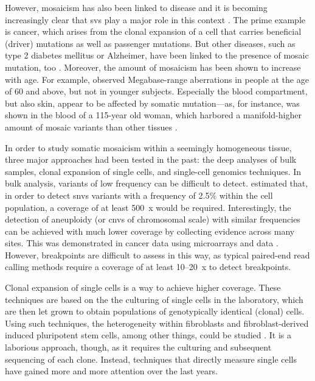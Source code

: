 However, mosaicism has also been linked to
disease and it is becoming increasingly clear that \aclp{sv} play a major
role in this context \citep{Forsberg2017}. The prime example is cancer, which
arises from the clonal expansion of a cell that carries beneficial (driver)
mutations as well as passenger mutations. But other
diseases, such as type 2 diabetes mellitus or Alzheimer, have been linked to the
presence of mosaic mutation, too \citep{Forsberg2017}. Moreover, the amount of
mosaicism has been shown to increase with age. For example, \citet{Forsberg2012}
observed Megabase-range aberrations in people at the age of 60 and above, but not in
younger subjects. Especially the blood compartment, but also skin, appear to be
affected by somatic mutation---as, for instance, was shown in the blood of a
115-year old woman, which harbored a manifold-higher amount of mosaic variants
than other tissues \citep{Holstege2014,Forsberg2017}.

In order to study somatic mosaicism within a seemingly homogeneous tissue, three
major approaches had been tested in the past: the deep analyses of bulk samples,
clonal expansion of single cells, and single-cell genomics techniques. In bulk
analysis, variants of low frequency can be difficult to detect.
\citet{Spencer2014} estimated that, in order to detect \acp{snv} variants with a
frequency of 2.5\% within the cell population, a coverage of at least 500~x
would be required. Interestingly, the detection of aneuploidy (or \acp{cnv} of
chromosomal scale) with similar frequencies can be achieved with much lower
coverage by collecting evidence across many \snv sites. This was demonstrated
in cancer data using microarrays and \mps data \citep{VanLoo2010,Carter2012,Roller2016}.
However, \sv breakpoints are difficult to assess in this way, as typical
paired-end read calling methods require a coverage of at least 10--20~x to
detect breakpoints.

Clonal expansion of single cells is a way to achieve higher
coverage. These techniques are based on the the culturing of single cells in the
laboratory, which are then let grown to obtain populations of genotypically identical (clonal) cells.
Using such techniques, the heterogeneity within fibroblasts and fibroblast-derived
induced pluripotent stem cells, among other things, could be studied
\citep{Saini2016,Abyzov2012}. It is a laborious approach, though, as it requires
the culturing and subsequent sequencing of each clone. Instead,
techniques that directly measure single cells have gained more and
more attention over the last years.

